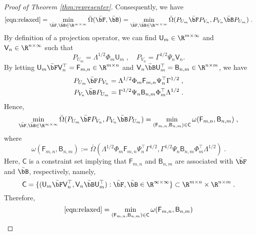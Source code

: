 \documentclass[11pt]{article}
\begin{document}
\begin{proof}[Proof of Theorem \ref{thm:representer}]
	Consequently, we have
	\begin{equation*}
		\eqref{eqn:relaxed}
		=
		\min_{\bar{\bF}, \bar{\bB} \in \R^{\infty \times \infty}} \bar{\Omega}(\bar{\bF}, \bar{\bB})
		=
		\min_{\bar{\bF}, \bar{\bB} \in \R^{\infty \times \infty}} \bar{\Omega}(P_{U_m} \bar{\bF} P_{V_n}, P_{V_n} \bar{\bB} P_{U_m}) \;.
	\end{equation*}
	By definition of a projection operator, we can find $\mathsf{U}_m \in \R^{m \times \infty}$ and $\mathsf{V}_n \in \R^{n \times \infty}$ such that 
	\begin{equation*}
		P_{U_m} = \Lambda^{1 / 2} \Phi_m \mathsf{U}_m \;, \quad 
		P_{V_n} = \Gamma^{1 / 2} \Psi_n \mathsf{V}_n.
	\end{equation*}
	By letting $\mathsf{U}_m \bar{\bF} \mathsf{V}_n^\top = \mathsf{F}_{m, n} \in \R^{m \times n}$ and $\mathsf{V}_n \bar{\bB} \mathsf{U}_m^\top = \mathsf{B}_{n, m} \in \R^{n \times m}$, we have
	\begin{align*}
		P_{U_m} \bar{\bF} P_{V_n} = \Lambda^{1/2} \Phi_m \mathsf{F}_{m,n} \Psi_n^\top \Gamma^{1/2} \;, \\
		P_{V_n} \bar{\bB} P_{U_m} = \Gamma^{1/2} \Psi_n \mathsf{B}_{n,m} \Phi_m^\top \Lambda^{1/2} \;.
	\end{align*}
	Hence, 
	\begin{equation*}
		\min_{\bar{\bF}, \bar{\bB} \in \R^{\infty \times \infty}} \bar{\Omega}(P_{U_m} \bar{\bF} P_{V_n}, P_{V_n} \bar{\bB} P_{U_m}) 
		=
		\min_{(\mathsf{F}_{m, n}, \mathsf{B}_{n, m}) \in \mathsf{C}} \omega(\mathsf{F}_{m, n}, \mathsf{B}_{n, m}) \;,
	\end{equation*}
	where	
	\begin{equation*}
		\omega(\mathsf{F}_{m, n}, \mathsf{B}_{n, m})
		:= \bar{\Omega}(\Lambda^{1 / 2} \Phi_m \mathsf{F}_{m, n} \Psi_n^\top \Gamma^{1 / 2}, \Gamma^{1 / 2} \Psi_n \mathsf{B}_{n, m} \Phi_m^\top \Lambda^{1 / 2}) \;.
	\end{equation*} 
	Here, $\mathsf{C}$ is a constraint set implying that $\mathsf{F}_{m, n}$ and $\mathsf{B}_{n, m}$ are associated with $\bar{\bF}$ and $\bar{\bB}$, respectively, namely,
	\begin{equation*}
		\mathsf{C} = \{(\mathsf{U}_m \bar{\bF} \mathsf{V}_n^\top,  \mathsf{V}_n \bar{\bB} \mathsf{U}_m^\top) : \bar{\bF}, \bar{\bB} \in \R^{\infty \times \infty}\} \subset \R^{m \times n} \times \R^{n \times m} \;.
	\end{equation*}
	Therefore,
	\begin{equation*}
		\eqref{eqn:relaxed}
		=
		\min_{(\mathsf{F}_{m, n}, \mathsf{B}_{n, m}) \in \mathsf{C}} \omega(\mathsf{F}_{m, n}, \mathsf{B}_{n, m})

\end{equation*}
\end{proof}
\end{document}

